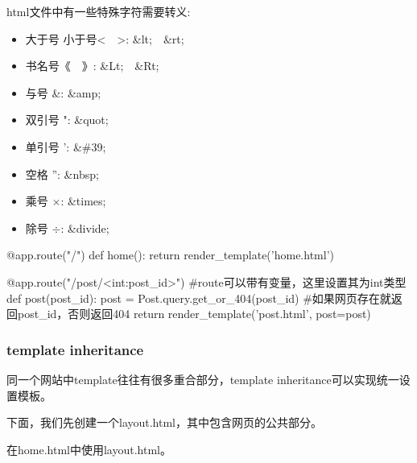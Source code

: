       html文件中有一些特殊字符需要转义:
        \begin{itemize}
          \item 大于号 小于号<~~>: \&lt;~~\&rt;
          \item 书名号《~~》: \&Lt;~~\&Rt;
          \item 与号 \&: \&amp;
          \item 双引号 ": \&quot;
          \item 单引号 ': \&\#39;
          \item 空格 '': \&nbsp;
          \item 乘号 $\times$: \&times;
          \item 除号 $\div$: \&divide;
        \end{itemize}

      \begin{codeblock}[language=python, caption={using template in my\_app.py}]
        @app.route("/")
        def home():
            return render_template('home.html')

        @app.route("/post/<int:post_id>") #route可以带有变量，这里设置其为int类型
        def post(post_id):
            post = Post.query.get_or_404(post_id) #如果网页存在就返回post\_id，否则返回404
            return render_template('post.html', post=post)
      \end{codeblock}

    \subsubsection{template inheritance}
      同一个网站中template往往有很多重合部分，template inheritance可以实现统一设置模板。

      下面，我们先创建一个layout.html，其中包含网页的公共部分。 

      在home.html中使用layout.html。


